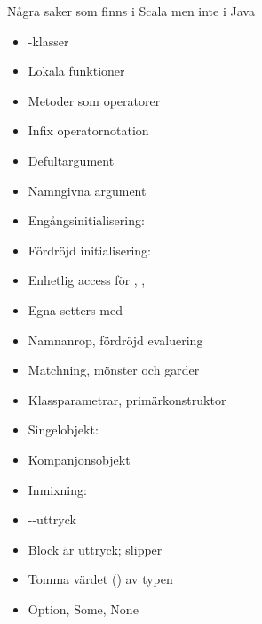 \begin{Slide}{Några saker som finns i Scala men inte i Java}\SlideFontSmall
\vspace{-1em}\begin{multicols}{2}
\begin{itemize}
\item {}-klasser

\item Lokala funktioner

\item Metoder som operatorer 

\item Infix operatornotation

\item Defultargument

\item Namngivna argument

\item Engångsinitialisering: 

\item Fördröjd initialisering: 

\item Enhetlig access för , , 

\item Egna setters med 

\item Namnanrop, fördröjd evaluering

\item Matchning, mönster och garder

\item Klassparametrar, primärkonstruktor

\item Singelobjekt: 

\item Kompanjonsobjekt

\item Inmixning:  

\item {}--uttryck

\item Block är uttryck; slipper 

\item Tomma värdet () av typen 

\item Option, Some, None


\end{itemize}
\end{multicols}
\end{Slide}
